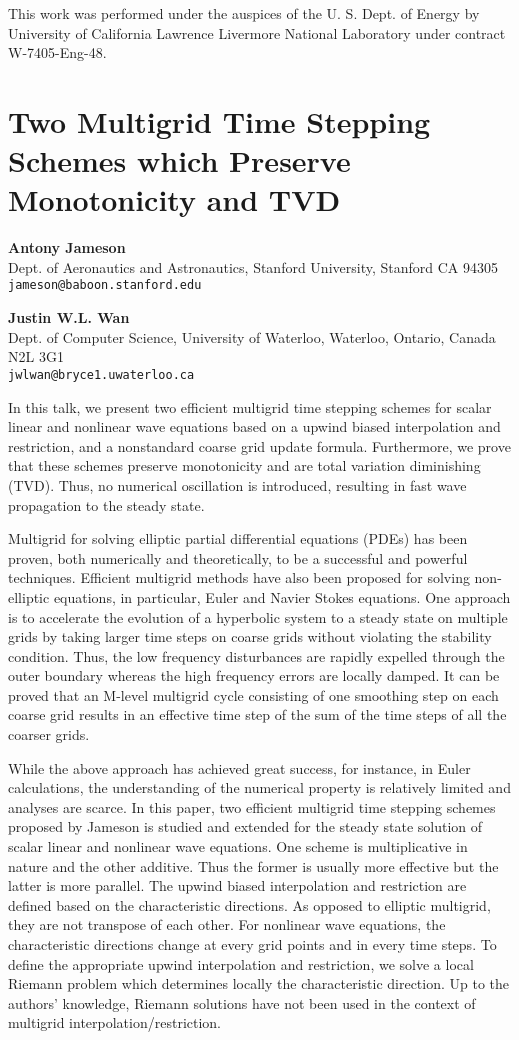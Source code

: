 \documentclass[11pt]{article}
\newcommand{\nextab}[4]{
	\section{#2}
	{\bf #1} \\ \nopagebreak
	{#3} \\ \nopagebreak
	{\tt #4} \nopagebreak
	}
\begin{document}
This work was performed under the auspices of the U. S.
Dept. of Energy by University of California Lawrence
Livermore National Laboratory under contract W-7405-Eng-48.





\nextab
{Antony Jameson}
{Two Multigrid Time Stepping Schemes which Preserve Monotonicity and TVD}
{Dept. of Aeronautics and Astronautics, Stanford University, Stanford CA 94305}
{jameson@baboon.stanford.edu}

{\bf Justin W.L. Wan} \\
Dept. of Computer Science, University of Waterloo, Waterloo, Ontario, Canada N2L 3G1
\\ {\tt jwlwan@bryce1.uwaterloo.ca}


In this talk, we present two efficient multigrid time stepping schemes for
scalar linear and nonlinear wave equations based on a upwind biased
interpolation and restriction, and a nonstandard coarse grid update
formula. Furthermore, we prove that these schemes preserve monotonicity
and are total variation diminishing (TVD). Thus, no numerical oscillation
is introduced, resulting in fast wave propagation to the steady state.


Multigrid for solving elliptic partial differential equations (PDEs)
has been proven, both numerically and theoretically, to be a successful
and powerful techniques. Efficient multigrid methods have also been
proposed for solving non-elliptic equations, in particular, Euler
and Navier Stokes equations. One approach is to accelerate the evolution
of a hyperbolic system to a
steady state on multiple grids by taking larger time steps on
coarse grids without violating the stability condition. Thus, the low
frequency disturbances are rapidly expelled through the outer boundary
whereas the high frequency errors are locally damped. It can be proved
that an M-level multigrid cycle consisting of one smoothing
step on each coarse grid results in an effective time step of the sum
of the time steps of all the coarser grids.


While the above approach has achieved great success, for instance, in
Euler calculations, the understanding of the numerical property is
relatively limited and analyses are scarce.
In this paper, two efficient multigrid time stepping schemes proposed by
Jameson is studied and extended for the steady state solution of
scalar linear and nonlinear wave equations. One scheme
is multiplicative in nature and the other additive. Thus the former is
usually more effective but the latter is more parallel.
The upwind biased interpolation and restriction are defined based on the
characteristic directions. As opposed to elliptic multigrid,
they are not transpose of each other. For nonlinear wave equations, the
characteristic directions change at every grid points and in every time
steps. To define the appropriate upwind interpolation and restriction, we
solve a local Riemann problem which determines locally the characteristic
direction. Up to the authors' knowledge, Riemann solutions have not
been used in the context of multigrid interpolation/restriction.
\end{document}
